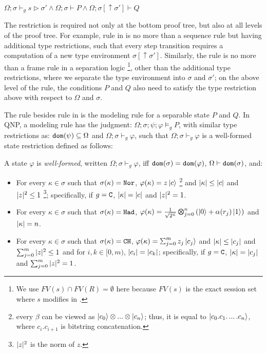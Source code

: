 {
\begin{center}
$
\Omega;\sigma\vdash_g s \triangleright \sigma'
\wedge
\Omega;\sigma\vdash P 
\wedge
\Omega;\sigma[\uparrow \sigma']\vdash Q
$
\end{center}
}

The restriction is required not only at the bottom proof tree, but also at all levels of the proof tree. For example, rule  in  is no more than a sequence rule but having additional type restrictions, such that every step transition requires a computation of a new type environment $\sigma[\uparrow \sigma']$.
Similarly, the  rule is no more than a frame rule in a separation logic \footnote{We use $FV(s)\cap FV(R)=\emptyset$ here because $FV(s)$ is the exact session set where $s$ modifies in \qafny. }, other than the additional type restrictions, where we separate the type environment into $\sigma$ and $\sigma'$; on the above level of the  rule, the conditions $P$ and $Q$ also need to satisfy the type restriction above with respect to $\Omega$ and $\sigma$.

The rule besides rule  in  is the modeling rule for a separable state $P$ and $Q$.
In QNP, a modeling rule has the judgment: $\Omega;\sigma;\psi;\varphi\models_g P$, with similar type restrictions as: $\mathtt{dom}(\psi) \subseteq \Omega$ and $\Omega;\sigma\vdash_g \varphi$, such that $\Omega;\sigma\vdash_g \varphi$ is a well-formed state restriction defined as follows:

\begin{definition}\label{def:well-formed}\rm 
  A state $\varphi$ is \emph{well-formed}, written
  $\Omega;\sigma \vdash_g \varphi$, iff $\mathtt{dom}(\sigma) = \mathtt{dom}(\varphi)$, $\Omega\vdash\mathtt{dom}(\sigma)$, and:
\begin{itemize}
\item For every $\kappa \in \sigma$ such that $\sigma(\kappa) = \texttt{Nor}$, $\varphi(\kappa)=z\left\vert{c}\right\rangle$ \footnote{every $\beta$ can be viewed as $\left\vert{c_0}\right\rangle\otimes ... \otimes \left\vert{c_n}\right\rangle$; thus, it is equal to $\left\vert{c_0.c_1.\,...\,.c_n}\right\rangle$, where $c_i.c_{i+1}$ is bitstring concatenation. } and $|\kappa|\le |c|$ and $|z|^2\le 1$ \footnote{$|z|^2$ is the norm of $z$. }; specifically, if $g=\texttt{C}$,  $|\kappa| = |c|$ and $|z|^2 = 1$.

\item For every $\kappa \in \sigma$ such that $\sigma(\kappa) = \texttt{Had}$, $\varphi(\kappa)=\shad{2^n}{n}{\alpha(r_j)}$ and $|\kappa|=n$.

\item For every $\kappa \in \sigma$ such that $\sigma(\kappa) = \texttt{CH}$, $\varphi(\kappa)=\sch{m}{z_j}{c_j}$ and $|\kappa|\le |c_j|$ and $\sum_{j=0}^m|z|^2\le 1$ and for $i,k\in [0,m)$, $|c_i|=|c_k|$;  specifically, if $g=\texttt{C}$,  $|\kappa| = |c_j|$ and $\sum_{j=0}^m|z|^2 = 1$.
\end{itemize}
\end{definition}

